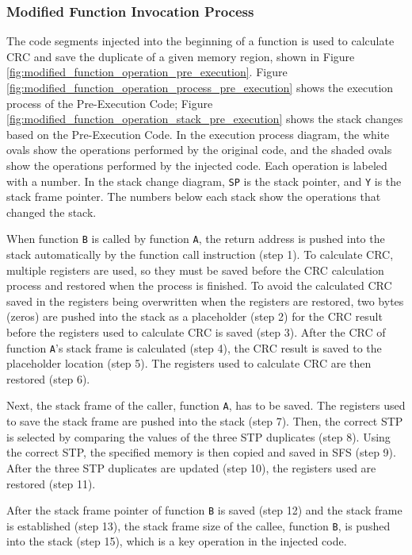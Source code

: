 \subsubsection{Modified Function Invocation Process}

The code segments injected into the beginning of a function is used to calculate CRC and save the duplicate of a given memory region, shown in Figure \ref{fig:modified_function_operation_pre_execution}. Figure \ref{fig:modified_function_operation_process_pre_execution} shows the execution process of the Pre-Execution Code; Figure \ref{fig:modified_function_operation_stack_pre_execution} shows the stack changes based on the Pre-Execution Code. In the execution process diagram, the white ovals show the operations performed by the original code, and the shaded ovals show the operations performed by the injected code. Each operation is labeled with a number. In the stack change diagram, \texttt{SP} is the stack pointer, and \texttt{Y} is the stack frame pointer. The numbers below each stack show the operations that changed the stack.

When function \texttt{B} is called by function \texttt{A}, the return address is pushed into the stack automatically by the function call instruction (step 1). To calculate CRC, multiple registers are used, so they must be saved before the CRC calculation process and restored when the process is finished. To avoid the calculated CRC saved in the registers being overwritten when the registers are restored, two bytes (zeros) are pushed into the stack as a placeholder (step 2) for the CRC result before the registers used to calculate CRC is saved (step 3). After the CRC of function \texttt{A}'s stack frame is calculated (step 4), the CRC result is saved to the placeholder location (step 5). The registers used to calculate CRC are then restored (step 6).

Next, the stack frame of the caller, function \texttt{A}, has to be saved. The registers used to save the stack frame are pushed into the stack (step 7). Then, the correct STP is selected by comparing the values of the three STP duplicates (step 8). Using the correct STP, the specified memory is then copied and saved in SFS (step 9). After the three STP duplicates are updated (step 10), the registers used are restored (step 11).

After the stack frame pointer of function \texttt{B} is saved (step 12) and the stack frame is established (step 13), the stack frame size of the callee, function \texttt{B}, is pushed into the stack (step 15), which is a key operation in the injected code. 

